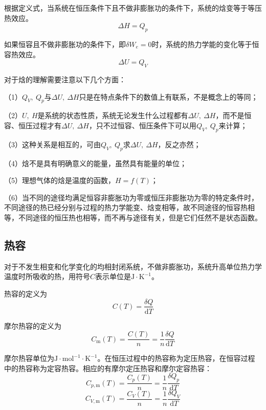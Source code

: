 \documentclass[lang=cn,newtx,10pt,scheme=chinese]{elegantbook}
\begin{document}
根据定义式，当系统在恒压条件下且不做非膨胀功的条件下，系统的焓变等于等压热效应。
\begin{equation}
	\Delta H = Q_p
\end{equation}

如果恒容且不做非膨胀功的条件下，即$\delta W_e =0$时，系统的热力学能的变化等于恒容热效应。
\begin{equation}
	\Delta U = Q_V
\end{equation}

对于焓的理解需要注意以下几个方面：

（1）$Q_V, \ Q_p$与$\Delta U, \ \Delta H$只是在特点条件下的数值上有联系，不是概念上的等同；

（2）$U, \ H$是系统的状态性质，系统无论发生什么过程都有$\Delta U, \ \Delta H$，而不是恒容、恒压过程才有$\Delta U, \ \Delta H$，只不过恒容、恒压条件下可以用$Q_V, \ Q_p$来计算；

（3）这种关系是相互的，可由$Q_V, \ Q_p$求$\Delta U, \ \Delta H$，反之亦然；

（4）焓不是具有明确意义的能量，虽然具有能量的单位；

（5）理想气体的焓是温度的函数，$H=f(T)$；

（6）当不同的途径均满足恒容非膨胀功为零或恒压非膨胀功为零的特定条件时，不同途径的热已经分别与过程的热力学能变、焓变相等，故不同途径的恒容热相等，不同途径的恒压热也相等，而不再与途径有关，但是它们任然不是状态函数。

\subsection{热容}

对于不发生相变和化学变化的均相封闭系统，不做非膨胀功，系统升高单位热力学温度时所吸收的热，用符号$C$表示单位是$\mathrm{J \cdot K^{-1}}$。

热容的定义为
\begin{equation}
	C(T)=\frac{\delta Q}{\mathrm{d}T}
\end{equation}

摩尔热容的定义为
\begin{equation}
	C_{\mathrm{m}}(T)=\frac{C(T)}{n}=\frac{1}{n}\frac{\delta Q}{\mathrm{d}T}
\end{equation}

摩尔热容单位为$\mathrm{J \cdot mol^{-1} \cdot K^{-1}}$。在恒压过程中的热容称为定压热容，在恒容过程中的热容称为定容热容。相应的有摩尔定压热容和摩尔定容热容：
\begin{equation}
	C_{p,\mathrm{m}}(T)=\frac{C_p(T)}{n}=\frac{1}{n}\frac{\delta Q_p}{\mathrm{d}T}
\end{equation}
\begin{equation}
	C_{V,\mathrm{m}}(T)=\frac{C_V(T)}{n}=\frac{1}{n}\frac{\delta Q_V}{\mathrm{d}T}
\end{equation}
\end{document}

